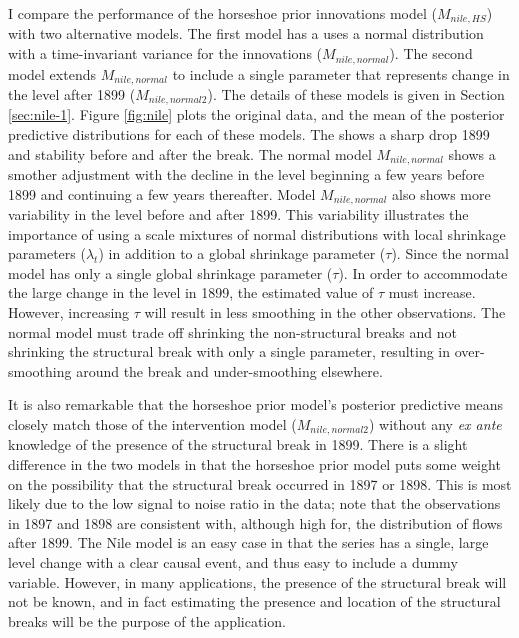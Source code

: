 \documentclass{article}
\begin{document}
\begin{itemize}
I compare the performance of the horseshoe prior innovations model ($M_{nile,HS}$) with two alternative models.
The first model has a uses a normal distribution with a time-invariant variance for the innovations ($M_{nile,normal}$).
The second model extends $M_{nile,normal}$ to include a single parameter that represents change in the level after 1899 ($M_{nile,normal2}$).
The details of these models is given in Section \ref{sec:nile-1}.
Figure \ref{fig:nile} plots the original data, and the mean of the posterior predictive distributions for each of these models.
The  shows a sharp drop 1899 and stability before and after the break.
The normal model $M_{nile,normal}$ shows a smother adjustment with the decline in the level beginning a few years before 1899 and continuing a few years thereafter.
Model $M_{nile,normal}$ also shows more variability in the level before and after 1899.
This variability illustrates the importance of using a scale mixtures of normal distributions with local shrinkage parameters ($\lambda_{t}$) in addition to a global shrinkage parameter ($\tau$).
Since the normal model has only a single global shrinkage parameter ($\tau$). 
In order to accommodate the large change in the level in 1899, the estimated value of $\tau$ must increase.
However, increasing $\tau$ will result in less smoothing in the other observations.
The normal model must trade off shrinking the non-structural breaks and not shrinking the structural break with only a single parameter, resulting in over-smoothing around the break and under-smoothing elsewhere.

It is also remarkable that the horseshoe prior model's posterior predictive means closely match those of the intervention model ($M_{nile,normal2}$) without any \textit{ex ante} knowledge of the presence of the structural break in 1899.
There is a slight difference in the two models in that the horseshoe prior model puts some weight on the possibility that the structural break occurred in 1897 or 1898.
This is most likely due to the low signal to noise ratio in the data; note that the observations in 1897 and 1898 are consistent with, although high for, the distribution of flows after 1899.
The Nile model is an easy case in that the series has a single, large level change with a clear causal event, and thus easy to include a dummy variable.
However, in many applications, the presence of the structural break will not be known, and in fact estimating the presence and location of the structural breaks will be the purpose of the application.


\end{itemize}
\end{document}
